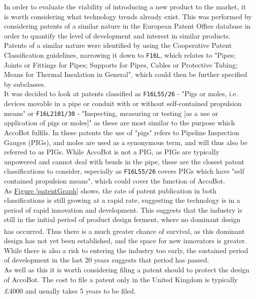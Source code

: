 \documentclass[11pt]{article}		%
\newcommand{\supercite}[1]{\textsuperscript{\cite{#1}}}		%
\newcommand{\figref}[1]{\hyperref[#1]{Figure \ref*{#1}}}    %
\begin{document}
        In order to evaluate the viability of introducing a new product to the market, it is worth considering what technology trends already exist.
        This was performed by considering patents of a similar nature in the European Patent Office database in order to quantify the level of development and interest in similar products.
        Patents of a similar nature were identified by using the Cooperative Patent Classification guidelines, narrowing it down to \verb|F16L|, which relates to "Pipes; Joints or Fittings for Pipes; Supports for Pipes, Cables or Protective Tubing; Means for Thermal Insulation in General"\cite{cpcSearch}, which could then be further specified by subclasses.
        \\
        \hspace*{3ex}It was decided to look at patents classified as \verb|F16L55/26| - "Pigs or moles, i.e. devices movable in a pipe or conduit with or without self-contained propulsion means" or \verb|F16L2101/30| - "Inspecting, measuring or testing [as a use or application of pigs or moles]" as these are most similar to the purpose which AccoBot fulfils.
		In these patents the use of "pigs" refers to Pipeline Inspection Gauges (PIGs), and moles are used as a synonymous term, and will thus also be referred to as PIGs.
		While AccoBot is not a PIG, as PIGs are typically unpowered and cannot deal with bends in the pipe, these are the closest patent classifications to consider, especially as \verb|F16L55/26| covers PIGs which have "self contained propulsion means", which could cover the function of AccoBot.
		\\
        \hspace*{3ex}As \figref{patentGraph} shows, the rate of patent publication in both classifications is still growing at a rapid rate, suggesting the technology is in a period of rapid innovation and development.
		This suggests that the industry is still in the initial period of product design ferment, where no dominant design has occurred\supercite{christensen1998innovation}.
		Thus there is a much greater chance of survival, as this dominant design has not yet been established, and the space for new innovators is greater.
		While there is also a risk to entering the industry too early, the sustained period of development in the last 20 years suggests that period has passed.
		\\
        \hspace*{3ex}As well as this it is worth considering filing a patent should to protect the design of AccoBot.
		The cost to file a patent only in the United Kingdom is typically £4000 and usually takes 5 years to be filed\supercite{uk2020patenting}.
\end{document}

